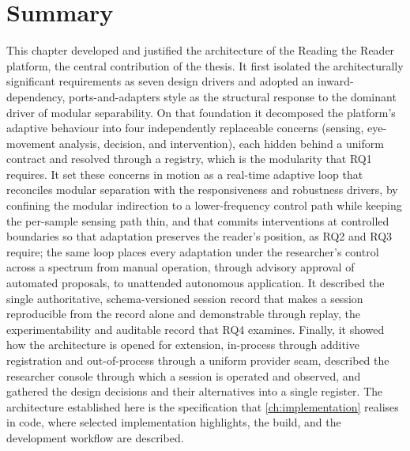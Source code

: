 \section{Summary}
\label{sec:design-summary}

This chapter developed and justified the architecture of the Reading the Reader platform, the central contribution of the thesis.
It first isolated the architecturally significant requirements as seven design drivers and adopted an inward-dependency, ports-and-adapters style as the structural response to the dominant driver of modular separability.
On that foundation it decomposed the platform's adaptive behaviour into four independently replaceable concerns (sensing, eye-movement analysis, decision, and intervention), each hidden behind a uniform contract and resolved through a registry, which is the modularity that RQ1 requires.
It set these concerns in motion as a real-time adaptive loop that reconciles modular separation with the responsiveness and robustness drivers, by confining the modular indirection to a lower-frequency control path while keeping the per-sample sensing path thin, and that commits interventions at controlled boundaries so that adaptation preserves the reader's position, as RQ2 and RQ3 require; the same loop places every adaptation under the researcher's control across a spectrum from manual operation, through advisory approval of automated proposals, to unattended autonomous application.
It described the single authoritative, schema-versioned session record that makes a session reproducible from the record alone and demonstrable through replay, the experimentability and auditable record that RQ4 examines.
Finally, it showed how the architecture is opened for extension, in-process through additive registration and out-of-process through a uniform provider seam, described the researcher console through which a session is operated and observed, and gathered the design decisions and their alternatives into a single register.
The architecture established here is the specification that \cref{ch:implementation} realises in code, where selected implementation highlights, the build, and the development workflow are described.
